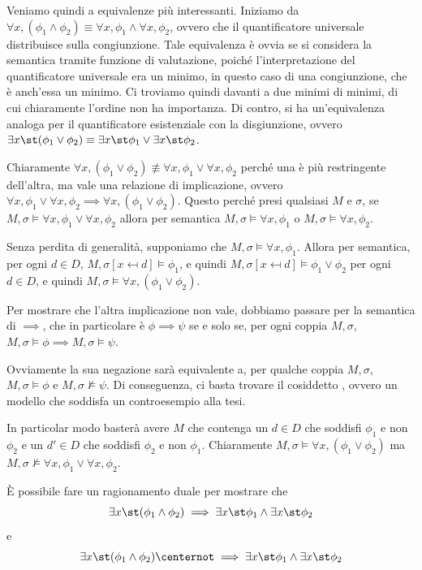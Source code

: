 Veniamo quindi a equivalenze più interessanti. Iniziamo da \(\forall x, (\phi_1 \land \phi_2) \equiv \forall x, \phi_1 \land \forall x, \phi_2\), ovvero che il quantificatore universale distribuisce sulla congiunzione. Tale equivalenza è ovvia se si considera la semantica tramite funzione di valutazione, poiché l'interpretazione del quantificatore universale era un minimo, in questo caso di una congiunzione, che è anch'essa un minimo. Ci troviamo quindi davanti a due minimi di minimi, di cui chiaramente l'ordine non ha importanza. Di contro, si ha un'equivalenza analoga per il quantificatore esistenziale con la disgiunzione, ovvero \(\exists x\st (\phi_1 \lor \phi_2) \equiv \exists x\st \phi_1 \lor \exists x\st \phi_2\).

Chiaramente \(\forall x, (\phi_1 \lor \phi_2) \not\equiv \forall x, \phi_1 \lor \forall x, \phi_2\) perché una è più restringente dell'altra, ma vale una relazione di implicazione, ovvero \(\forall x,\phi_1 \lor \forall x, \phi_2 \implies \forall x, (\phi_1 \lor \phi_2)\). Questo perché presi qualsiasi \(M\) e \(\sigma\), se \(M,\sigma\models\forall x,\phi_1 \lor \forall x, \phi_2\) allora per semantica \(M,\sigma\models \forall x,\phi_1\) o \(M,\sigma\models\forall x, \phi_2\). 

Senza perdita di generalità, supponiamo che \(M,\sigma\models\forall x,\phi_1\). Allora per semantica, per ogni \(d\in D\), \(M,\sigma[x\mapsfrom d]\models \phi_1\), e quindi \(M,\sigma[x\mapsfrom d]\models \phi_1 \lor \phi_2\) per ogni \(d\in D\), e quindi \(M,\sigma\models \forall x, (\phi_1 \lor \phi_2)\). 

Per mostrare che l'altra implicazione non vale, dobbiamo passare per la semantica di \(\implies\), che in particolare è \(\phi \implies\psi\) se e solo se, per ogni coppia \(M, \sigma\), \(M,\sigma\models \phi \implies M,\sigma\models \psi\). 

Ovviamente la sua negazione sarà equivalente a, per qualche coppia \(M, \sigma\), \(M,\sigma\models \phi\) e \(M,\sigma\not\models \psi\). Di conseguenza, ci basta trovare il cosiddetto , ovvero un modello che soddisfa un controesempio alla tesi. 

In particolar modo basterà avere \(M\) che contenga un \(d \in D\) che soddisfi \(\phi_1\) e non \(\phi_2\) e un \(d' \in D\) che soddisfi \(\phi_2\) e non \(\phi_1\). Chiaramente \(M,\sigma\models \forall x, (\phi_1 \lor \phi_2)\) ma \(M,\sigma\not\models \forall x, \phi_1 \lor \forall x, \phi_2\).

È possibile fare un ragionamento duale per mostrare che 
\[\exists x\st( \phi_1 \land \phi_2) \implies \exists x\st \phi_1 \land \exists x\st \phi_2\]
e
\[\exists x\st (\phi_1 \land \phi_2 )\centernot\implies \exists x\st \phi_1 \land \exists x\st \phi_2\]

